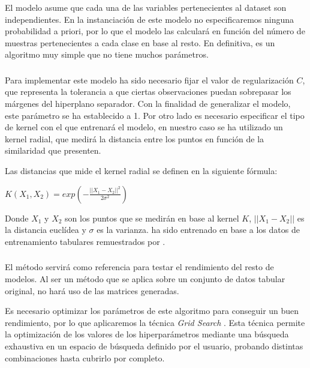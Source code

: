            El modelo  asume que cada una de las variables pertenecientes al dataset son independientes. En la instanciación de este modelo no especificaremos ninguna probabilidad a priori, por lo que el modelo las calculará en función del número de muestras pertenecientes a cada clase en base al resto. En definitiva, es un algoritmo muy simple que no tiene muchos parámetros.


        \subsubsection{}

            Para implementar este modelo ha sido necesario fijar el valor de regularización $C$, que representa la tolerancia a que ciertas observaciones puedan sobrepasar los márgenes del hiperplano separador. Con la finalidad de generalizar el modelo, este parámetro se ha establecido a 1. Por otro lado es necesario especificar el tipo de kernel con el que entrenará el modelo, en nuestro caso se ha utilizado un kernel radial, que medirá la distancia entre los puntos en función de la similaridad que presenten.

            Las distancias que mide el kernel radial se definen en la siguiente fórmula:

            \begin{center}
                $K(X_1, X_2) = exp (- \frac{||X_1 - X_2||^2}{2 \sigma^2})$
            \end{center}

            Donde $X_1$ y $X_2$ son los puntos que se medirán en base al kernel $K$, $||X_1 - X_2||$ es la distancia euclídea y $\sigma$ es la varianza.  ha sido entrenado en base a los datos de entrenamiento tabulares remuestrados por .

        \subsubsection{}

            El método  servirá como referencia para testar el rendimiento del resto de modelos. Al ser un método que se aplica sobre un conjunto de datos tabular original, no hará uso de las matrices generadas.

            Es necesario optimizar los parámetros de este algoritmo para conseguir un buen rendimiento, por lo que aplicaremos la técnica \textit{Grid Search} \cite{GridSearchSklearnLibrary}. Esta técnica permite la optimización de los valores de los hiperparámetros mediante una búsqueda exhaustiva en un espacio de búsqueda definido por el usuario, probando distintas combinaciones hasta cubrirlo por completo. 

